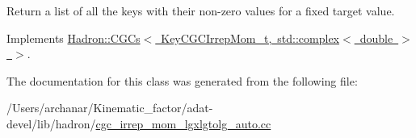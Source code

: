 Return a list of all the keys with their non-\/zero values for a fixed target value. 



Implements \mbox{\hyperlink{classHadron_1_1CGCs_a8d2d80be37b603359708ebdd5923ff47}{Hadron\+::\+C\+G\+Cs$<$ Key\+C\+G\+C\+Irrep\+Mom\+\_\+t, std\+::complex$<$ double $>$ $>$}}.



The documentation for this class was generated from the following file\+:\begin{DoxyCompactItemize}
\item 
/\+Users/archanar/\+Kinematic\+\_\+factor/adat-\/devel/lib/hadron/\mbox{\hyperlink{adat-devel_2lib_2hadron_2cgc__irrep__mom__lgxlgtolg__auto_8cc}{cgc\+\_\+irrep\+\_\+mom\+\_\+lgxlgtolg\+\_\+auto.\+cc}}\end{DoxyCompactItemize}
